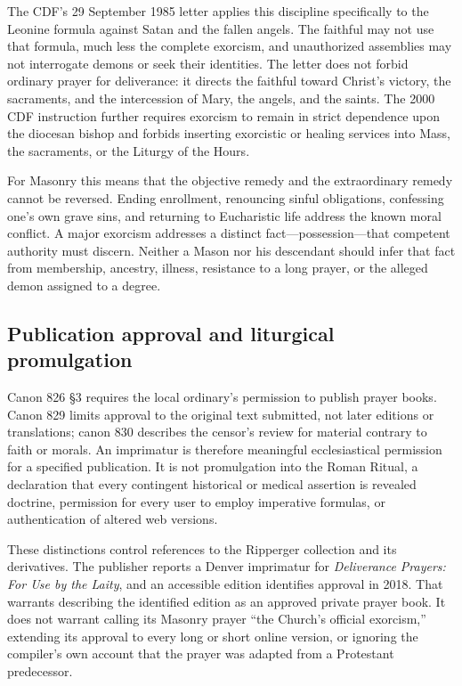 The CDF's 29 September 1985 letter applies this discipline specifically to the Leonine formula against Satan and the fallen angels. The faithful may not use that formula, much less the complete exorcism, and unauthorized assemblies may not interrogate demons or seek their identities. The letter does not forbid ordinary prayer for deliverance: it directs the faithful toward Christ's victory, the sacraments, and the intercession of Mary, the angels, and the saints. The 2000 CDF instruction further requires exorcism to remain in strict dependence upon the diocesan bishop and forbids inserting exorcistic or healing services into Mass, the sacraments, or the Liturgy of the Hours.

For Masonry this means that the objective remedy and the extraordinary remedy cannot be reversed. Ending enrollment, renouncing sinful obligations, confessing one's own grave sins, and returning to Eucharistic life address the known moral conflict. A major exorcism addresses a distinct fact---possession---that competent authority must discern. Neither a Mason nor his descendant should infer that fact from membership, ancestry, illness, resistance to a long prayer, or the alleged demon assigned to a degree.

\subsection{Publication approval and liturgical promulgation}

Canon 826 \S3 requires the local ordinary's permission to publish prayer books. Canon 829 limits approval to the original text submitted, not later editions or translations; canon 830 describes the censor's review for material contrary to faith or morals. An imprimatur is therefore meaningful ecclesiastical permission for a specified publication. It is not promulgation into the Roman Ritual, a declaration that every contingent historical or medical assertion is revealed doctrine, permission for every user to employ imperative formulas, or authentication of altered web versions.

These distinctions control references to the Ripperger collection and its derivatives. The publisher reports a Denver imprimatur for \emph{Deliverance Prayers: For Use by the Laity}, and an accessible edition identifies approval in 2018. That warrants describing the identified edition as an approved private prayer book. It does not warrant calling its Masonry prayer “the Church's official exorcism,” extending its approval to every long or short online version, or ignoring the compiler's own account that the prayer was adapted from a Protestant predecessor.


